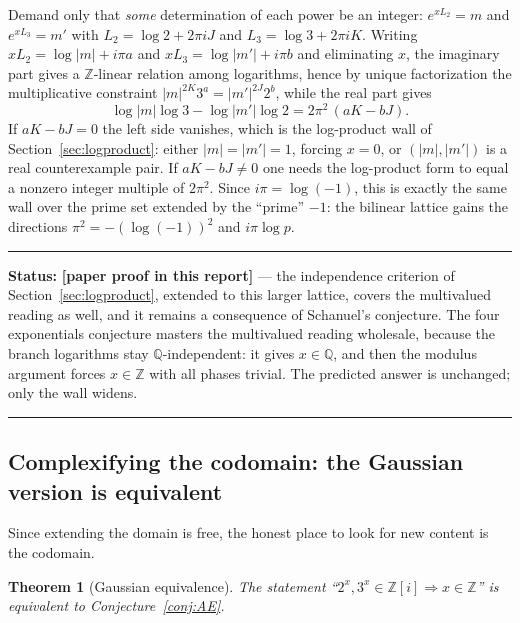 \documentclass[11pt,oneside]{article}
\newtheorem{theorem}{Theorem}[section]
\theoremstyle{definition}
\theoremstyle{remark}
\newcommand{\Z}{\mathbb Z}
\newcommand{\Q}{\mathbb Q}
\newcommand{\statusnew}{\textcolor{newgreen}{\textbf{[paper proof in this report]}}}
\newenvironment{statusbox}[1]
{\begin{center}\begin{minipage}{0.94\textwidth}\raggedright\hbadness=10000\hrule
\vspace{0.45em}\textbf{Status:} #1\par\vspace{0.35em}}
{\vspace{0.35em}\hrule\end{minipage}\end{center}}
\begin{document}
Demand only that \emph{some} determination of each power be an integer:
$e^{xL_2}=m$ and $e^{xL_3}=m'$ with $L_2=\log2+2\pi iJ$ and $L_3=\log3+2\pi iK$.  Writing
$xL_2=\log|m|+i\pi a$ and $xL_3=\log|m'|+i\pi b$ and eliminating $x$, the imaginary part gives
a $\Z$-linear relation among logarithms, hence by unique factorization the multiplicative
constraint $|m|^{2K}3^a=|m'|^{2J}2^b$, while the real part gives
\begin{equation}
  \log|m|\log3-\log|m'|\log2=2\pi^2\,(aK-bJ).
  \label{eq:va-branch}
\end{equation}
If $aK-bJ=0$ the left side vanishes, which is the log-product wall of
Section~\ref{sec:logproduct}: either $|m|=|m'|=1$, forcing $x=0$, or $(|m|,|m'|)$ is a real
counterexample pair.  If $aK-bJ\ne0$ one needs the log-product form to equal a nonzero integer
multiple of $2\pi^2$.  Since $i\pi=\log(-1)$, this is exactly the same wall over the prime set
extended by the ``prime'' $-1$: the bilinear lattice gains the directions
$\pi^2=-(\log(-1))^2$ and $i\pi\log p$.

\begin{statusbox}{\statusnew{} --- the independence criterion of
Section~\ref{sec:logproduct}, extended to this larger lattice, covers the multivalued reading
as well, and it remains a consequence of Schanuel's conjecture.  The four exponentials
conjecture masters the multivalued reading wholesale, because the branch logarithms stay
$\Q$-independent: it gives $x\in\Q$, and then the modulus argument forces $x\in\Z$ with all
phases trivial.  The predicted answer is unchanged; only the wall widens.}
\end{statusbox}

\subsection{Complexifying the codomain: the Gaussian version is equivalent}

Since extending the domain is free, the honest place to look for new content is the codomain.

\begin{theorem}[Gaussian equivalence]
\label{va:thm-gaussian}
The statement ``$2^x,3^x\in\Z[i]\Rightarrow x\in\Z$'' is equivalent to
Conjecture~\ref{conj:AE}.
\end{theorem}
\end{document}
